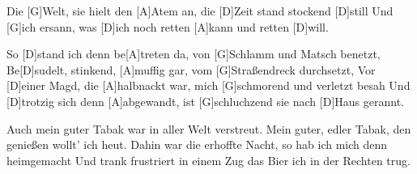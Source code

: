 \begin{guitar}
	\begin{highlightbar}
		Die [G]Welt, sie hielt den [A]Atem an, die [D]Zeit stand stockend [D]still
		Und [G]ich ersann, was [D]ich noch retten [A]kann und retten [D]will.
	\end{highlightbar}
	
	So [D]stand ich denn be[A]treten da, von [G]Schlamm und Matsch benetzt,
	Be[D]sudelt, stinkend, [A]muffig gar, vom [G]Straßendreck durchsetzt,
	Vor [D]einer Magd, die [A]halbnackt war, mich [G]schmorend und verletzt besah
	Und [D]trotzig sich denn [A]abgewandt, ist [G]schluchzend sie nach [D]Haus gerannt.
	
	Auch mein guter Tabak war in aller Welt verstreut.
	Mein guter, edler Tabak, den genießen wollt' ich heut.
	Dahin war die erhoffte Nacht, so hab ich mich denn heimgemacht
	Und trank frustriert in einem Zug das Bier ich in der Rechten trug.
\end{guitar}